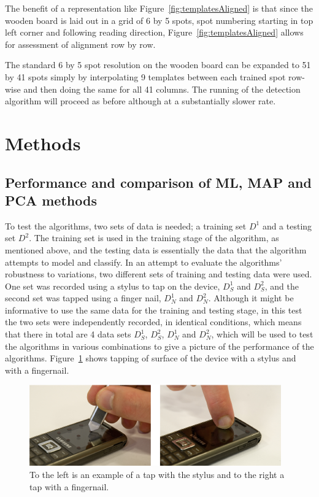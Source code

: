 The benefit of a representation like Figure~\ref{fig:templatesAligned} is that since the wooden board is laid out in a grid of 6 by 5 spots, spot numbering starting in top left corner and following reading direction, Figure~\ref{fig:templatesAligned} allows for assessment of alignment row by row.

The standard 6 by 5 spot resolution on the wooden board can be expanded to 51 by 41 spots simply by interpolating 9 templates between each trained spot row-wise and then doing the same for all 41 columns. The running of the detection algorithm will proceed as before although at a substantially slower rate.

\section{Methods}
\subsection{Performance and comparison of ML, MAP and PCA methods}
To test the algorithms, two sets of data is needed; a training set $D^1$ and a testing set $D^2$. The training set is used in the training stage of the algorithm, as mentioned above, and the testing data is essentially the data that the algorithm attempts to model and classify. In an attempt to evaluate the algorithms' robustness to variations, two different sets of training and testing data were used. One set was recorded using a stylus to tap on the device, $D^1_S$ and $D^2_S$, and the second set was tapped using a finger nail, $D^1_N$ and $D^2_N$. Although it might be informative to use the same data for the training and testing stage, in this test the two sets were independently recorded, in identical conditions, which means that there in total are 4 data sets $D^1_S$, $D^2_S$, $D^1_N$ and $D^2_N$, which will be used to test the algorithms in various combinations to give a picture of the performance of the algorithms. Figure~\ref{fig:tapSN} shows tapping of surface of the device with a stylus and with a fingernail.

\begin{figure}[!]
\centering
\includegraphics[width=410 px]{tapSN.png}
\caption{To the left is an example of a tap with the stylus and to the right a tap with a fingernail.}\label{fig:tapSN}
\end{figure}

